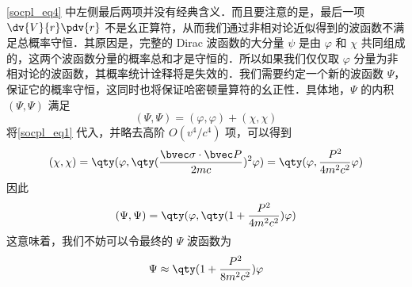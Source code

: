\autoref{socpl_eq4} 中左侧最后两项并没有经典含义．而且要注意的是，最后一项 $\dv{V}{r}\pdv{r}$ 不是幺正算符，从而我们通过非相对论近似得到的波函数不满足总概率守恒．其原因是，完整的 Dirac 波函数的大分量 $\psi$ 是由 $\varphi$ 和 $\chi$ 共同组成的，这两个波函数分量的概率总和才是守恒的．所以如果我们仅仅取 $\varphi$ 分量为非相对论的波函数，其概率统计诠释将是失效的．我们需要约定一个新的波函数 $\Psi$，保证它的概率守恒，这同时也将保证哈密顿量算符的幺正性．具体地，$\Psi$ 的内积 $(\Psi,\Psi)$ 满足
\begin{equation}
(\Psi,\Psi)=(\varphi,\varphi)+(\chi,\chi)
\end{equation}
将\autoref{socpl_eq1} 代入，并略去高阶 $O(v^4/c^4)$ 项，可以得到
\begin{equation}
(\chi,\chi)=\qty(\varphi,\qty(\frac{\bvec \sigma\cdot \bvec P}{2mc})^2\varphi)=\qty(\varphi,\frac{P^2}{4m^2c^2}\varphi)
\end{equation}
因此
\begin{equation}
(\Psi,\Psi)=\qty(\varphi,\qty(1+\frac{P^2}{4m^2c^2})\varphi)
\end{equation}
这意味着，我们不妨可以令最终的 $\Psi$ 波函数为
\begin{equation}
\Psi\approx\qty(1+\frac{P^2}{8m^2c^2})\varphi
\end{equation}
